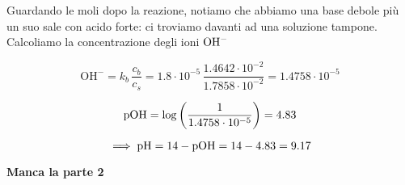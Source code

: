 Guardando le moli dopo la reazione, notiamo che abbiamo una base debole più un suo sale con acido forte: ci troviamo davanti ad una soluzione tampone. Calcoliamo la concentrazione degli ioni $\rm OH^-$

$$\text{OH}^-=k_b\,\frac{c_b}{c_s}
=1.8 \cdot 10^{-5}\,\frac{1.4642 \cdot 10^{-2}}{1.7858 \cdot 10^{-2}}
=1.4758 \cdot 10^{-5}$$

$$\rm pOH=\log \left( \frac{1}{1.4758 \cdot 10^{-5}} \right)=4.83$$

$$\implies \rm pH=14-pOH=14-4.83=9.17$$

\textbf{Manca la parte 2}